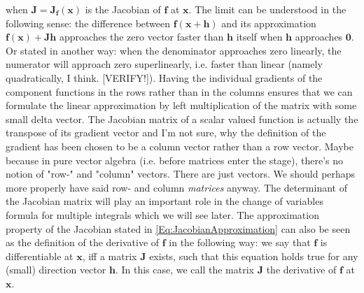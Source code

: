 when $\mathbf{J} = \mathbf{J_f}(\mathbf{x})$ is the Jacobian of  $\mathbf{f}$ at $\mathbf{x}$. The limit can be understood in the following sense: the difference between $\mathbf{f(x+h)}$ and its approximation $\mathbf{f(x) + J h}$ approaches the zero vector faster than $\mathbf{h}$ itself when $\mathbf{h}$ approaches $\mathbf{0}$. Or stated in another way: when the denominator approaches zero linearly, the numerator will approach zero superlinearly, i.e. faster than linear (namely quadratically, I think. [VERIFY!]). Having the individual gradients of the component functions in the rows rather than in the columns ensures that we can formulate the linear approximation by left multiplication of the matrix with some small delta vector. The Jacobian matrix of a scalar valued function is actually the transpose of its gradient vector and I'm not sure, why the definition of the gradient has been chosen to be a column vector rather than a row vector. Maybe because in pure vector algebra (i.e. before matrices enter the stage), there's no notion of "row-" and "column" vectors. There are just vectors. We should perhaps more properly have said row- and column \emph{matrices} anyway. The determinant of the Jacobian matrix will play an important role in the change of variables formula for multiple integrals which we will see later. The approximation property of the Jacobian stated in \ref{Eq:JacobianApproximation} can also be seen as the definition of the derivative of $\mathbf{f}$ in the following way: we say that $\mathbf{f}$ is differentiable at $\mathbf{x}$, iff a matrix $\mathbf{J}$ exists, such that this equation holds true for any (small) direction vector $\mathbf{h}$. In this case, we call the matrix $\mathbf{J}$ the derivative of $\mathbf{f}$ at $\mathbf{x}$.





